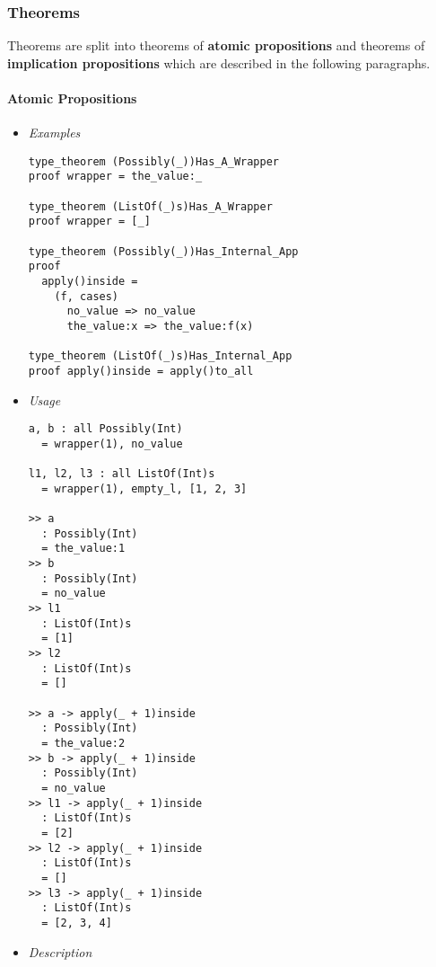 \documentclass{article}
\begin{document}
\subsubsection{Theorems}
\label{subsubsec:ttheo}

Theorems are split into theorems of \textbf{atomic propositions} and
theorems of \textbf{implication propositions} which are described in the
following paragraphs.

\paragraph{Atomic Propositions}

\begin{itemize}
\item \textit{Examples}

\begin{verbatim}
type_theorem (Possibly(_))Has_A_Wrapper
proof wrapper = the_value:_

type_theorem (ListOf(_)s)Has_A_Wrapper
proof wrapper = [_]

type_theorem (Possibly(_))Has_Internal_App
proof
  apply()inside =
    (f, cases)
      no_value => no_value
      the_value:x => the_value:f(x)

type_theorem (ListOf(_)s)Has_Internal_App
proof apply()inside = apply()to_all
\end{verbatim}

\item \textit{Usage}

\begin{verbatim} 
a, b : all Possibly(Int)
  = wrapper(1), no_value

l1, l2, l3 : all ListOf(Int)s
  = wrapper(1), empty_l, [1, 2, 3]

>> a
  : Possibly(Int)
  = the_value:1
>> b
  : Possibly(Int)
  = no_value
>> l1
  : ListOf(Int)s
  = [1]
>> l2
  : ListOf(Int)s
  = []

>> a -> apply(_ + 1)inside
  : Possibly(Int)
  = the_value:2
>> b -> apply(_ + 1)inside
  : Possibly(Int)
  = no_value
>> l1 -> apply(_ + 1)inside
  : ListOf(Int)s
  = [2]
>> l2 -> apply(_ + 1)inside
  : ListOf(Int)s
  = []
>> l3 -> apply(_ + 1)inside
  : ListOf(Int)s
  = [2, 3, 4]
\end{verbatim}

\item \textit{Description}


\end{itemize}
\end{document}

